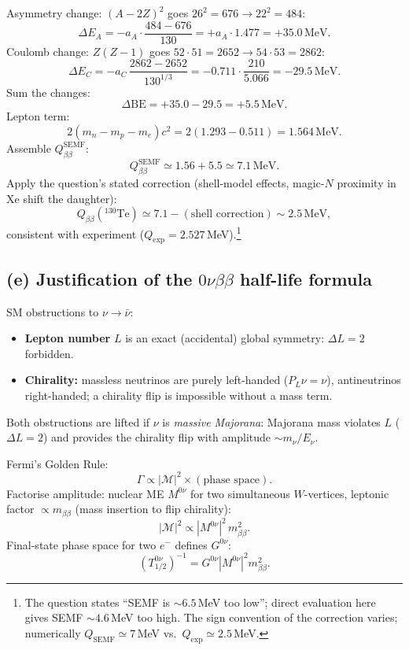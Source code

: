 \documentclass[11pt]{article}
\begin{document}
Asymmetry change: $(A-2Z)^2$ goes $26^2=676 \to 22^2=484$:
\[
\Delta E_A=-a_A\cdot\frac{484-676}{130}=+a_A\cdot 1.477=+35.0\,\mathrm{MeV}.
\]
Coulomb change: $Z(Z-1)$ goes $52\cdot 51=2652 \to 54\cdot 53=2862$:
\[
\Delta E_C=-a_C\,\frac{2862-2652}{130^{1/3}}=-0.711\cdot\frac{210}{5.066}=-29.5\,\mathrm{MeV}.
\]
Sum the changes:
\[
\Delta\mathrm{BE}=+35.0-29.5=+5.5\,\mathrm{MeV}.
\]
Lepton term:
\[
2(m_n-m_p-m_e)c^2=2(1.293-0.511)=1.564\,\mathrm{MeV}.
\]
Assemble $Q_{\beta\beta}^\mathrm{SEMF}$:
\[
Q_{\beta\beta}^\mathrm{SEMF}\simeq 1.56+5.5\simeq 7.1\,\mathrm{MeV}.
\]
Apply the question's stated correction (shell-model effects, magic-$N$ proximity in Xe shift the daughter):
\[
\boxed{\;Q_{\beta\beta}(^{130}\mathrm{Te})\simeq 7.1-(\text{shell correction})\sim 2.5\,\mathrm{MeV},\;}
\]
consistent with experiment ($Q_\mathrm{exp}=2.527$\,MeV).\footnote{The question states ``SEMF is $\sim 6.5$\,MeV too low''; direct evaluation here gives SEMF $\sim 4.6$\,MeV too high. The sign convention of the correction varies; numerically $Q_\mathrm{SEMF}\simeq 7$\,MeV vs.\ $Q_\mathrm{exp}\simeq 2.5$\,MeV.}

\subsection*{(e) Justification of the $0\nu\beta\beta$ half-life formula}

SM obstructions to $\nu\to\bar\nu$:
\begin{itemize}
\item \textbf{Lepton number} $L$ is an exact (accidental) global symmetry: $\Delta L=2$ forbidden.
\item \textbf{Chirality:} massless neutrinos are purely left-handed ($P_L\nu=\nu$), antineutrinos right-handed; a chirality flip is impossible without a mass term.
\end{itemize}
Both obstructions are lifted if $\nu$ is \emph{massive Majorana}: Majorana mass violates $L$ ($\Delta L=2$) and provides the chirality flip with amplitude $\sim m_\nu/E_\nu$.

Fermi's Golden Rule:
\[
\Gamma\propto |\mathcal M|^2 \times(\text{phase space}).
\]
Factorise amplitude: nuclear ME $M^{0\nu}$ for two simultaneous $W$-vertices, leptonic factor $\propto m_{\beta\beta}$ (mass insertion to flip chirality):
\[
|\mathcal M|^2\propto |M^{0\nu}|^2\,m_{\beta\beta}^2.
\]
Final-state phase space for two $e^-$ defines $G^{0\nu}$:
\begin{equation}
\boxed{\;(T^{0\nu}_{1/2})^{-1}=G^{0\nu}|M^{0\nu}|^2 m_{\beta\beta}^2.\;}
\label{eq:T0nu}
\end{equation}
\end{document}
